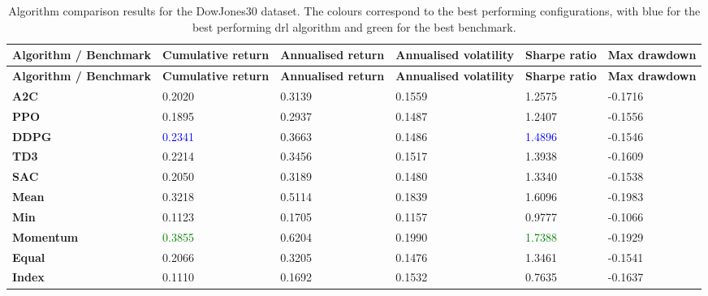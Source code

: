 \begin{longtable}{|p{2cm}|p{2.1cm}|p{2.1cm}|p{2.1cm}|p{1.5cm}|p{2cm}|}
    \caption{Algorithm comparison results for the DowJones30 dataset. The colours correspond to the best performing configurations, with blue for the best performing \acrshort{drl} algorithm and green for the best benchmark.}
    \label{tab:experiment_algorithms_dow30} 
    \\ 
    \hline
    \textbf{Algorithm / Benchmark} & \textbf{Cumulative return} & \textbf{Annualised return} & \textbf{Annualised volatility} & \textbf{Sharpe ratio} & \textbf{Max drawdown}  \\ \midrule
    \endfirsthead

    \hline
    \textbf{Algorithm / Benchmark} & \textbf{Cumulative return} & \textbf{Annualised return} & \textbf{Annualised volatility} & \textbf{Sharpe ratio} & \textbf{Max drawdown}  \\ \midrule
    \endhead

    \endfoot
    \hline

    \textbf{A2C} & 0.2020 & 0.3139 & 0.1559 & 1.2575 & -0.1716 \\ \hline
    \textbf{PPO} & 0.1895 & 0.2937 & 0.1487 & 1.2407 & -0.1556 \\ \hline
    \textbf{DDPG} & \textcolor{blue}{0.2341} & 0.3663 & 0.1486 & \textcolor{blue}{1.4896} & -0.1546 \\ \hline
    \textbf{TD3} & 0.2214 & 0.3456 & 0.1517 & 1.3938 & -0.1609 \\ \hline
    \textbf{SAC} & 0.2050 & 0.3189 & 0.1480 & 1.3340 & -0.1538 \\ \hline
    \textbf{Mean} & 0.3218 & 0.5114 & 0.1839 & 1.6096 & -0.1983 \\ \hline
    \textbf{Min} & 0.1123 & 0.1705 & 0.1157 & 0.9777 & -0.1066 \\ \hline
    \textbf{Momentum} & \textcolor{green}{0.3855} & 0.6204 & 0.1990 & \textcolor{green}{1.7388} & -0.1929 \\ \hline
    \textbf{Equal} & 0.2066 & 0.3205 & 0.1476 & 1.3461 & -0.1541 \\ \hline
    \textbf{Index} & 0.1110 & 0.1692 & 0.1532 & 0.7635 & -0.1637 \\ \hline
\end{longtable}